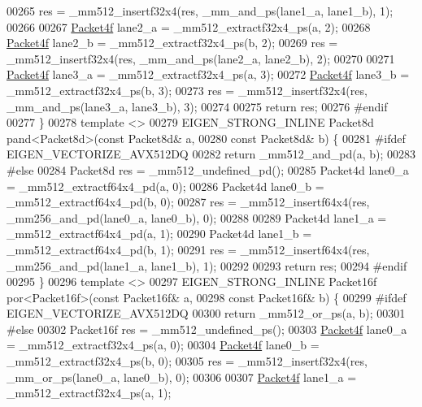 \begin{DoxyCode}
00265   res = \_mm512\_insertf32x4(res, \_mm\_and\_ps(lane1\_a, lane1\_b), 1);
00266 
00267   \hyperlink{struct_eigen_1_1internal_1_1_packet4f}{Packet4f} lane2\_a = \_mm512\_extractf32x4\_ps(a, 2);
00268   \hyperlink{struct_eigen_1_1internal_1_1_packet4f}{Packet4f} lane2\_b = \_mm512\_extractf32x4\_ps(b, 2);
00269   res = \_mm512\_insertf32x4(res, \_mm\_and\_ps(lane2\_a, lane2\_b), 2);
00270 
00271   \hyperlink{struct_eigen_1_1internal_1_1_packet4f}{Packet4f} lane3\_a = \_mm512\_extractf32x4\_ps(a, 3);
00272   \hyperlink{struct_eigen_1_1internal_1_1_packet4f}{Packet4f} lane3\_b = \_mm512\_extractf32x4\_ps(b, 3);
00273   res = \_mm512\_insertf32x4(res, \_mm\_and\_ps(lane3\_a, lane3\_b), 3);
00274 
00275   \textcolor{keywordflow}{return} res;
00276 \textcolor{preprocessor}{#endif}
00277 \}
00278 \textcolor{keyword}{template} <>
00279 EIGEN\_STRONG\_INLINE Packet8d pand<Packet8d>(\textcolor{keyword}{const} Packet8d& a,
00280                                             \textcolor{keyword}{const} Packet8d& b) \{
00281 \textcolor{preprocessor}{#ifdef EIGEN\_VECTORIZE\_AVX512DQ}
00282   \textcolor{keywordflow}{return} \_mm512\_and\_pd(a, b);
00283 \textcolor{preprocessor}{#else}
00284   Packet8d res = \_mm512\_undefined\_pd();
00285   Packet4d lane0\_a = \_mm512\_extractf64x4\_pd(a, 0);
00286   Packet4d lane0\_b = \_mm512\_extractf64x4\_pd(b, 0);
00287   res = \_mm512\_insertf64x4(res, \_mm256\_and\_pd(lane0\_a, lane0\_b), 0);
00288 
00289   Packet4d lane1\_a = \_mm512\_extractf64x4\_pd(a, 1);
00290   Packet4d lane1\_b = \_mm512\_extractf64x4\_pd(b, 1);
00291   res = \_mm512\_insertf64x4(res, \_mm256\_and\_pd(lane1\_a, lane1\_b), 1);
00292 
00293   \textcolor{keywordflow}{return} res;
00294 \textcolor{preprocessor}{#endif}
00295 \}
00296 \textcolor{keyword}{template} <>
00297 EIGEN\_STRONG\_INLINE Packet16f por<Packet16f>(\textcolor{keyword}{const} Packet16f& a,
00298                                              \textcolor{keyword}{const} Packet16f& b) \{
00299 \textcolor{preprocessor}{#ifdef EIGEN\_VECTORIZE\_AVX512DQ}
00300   \textcolor{keywordflow}{return} \_mm512\_or\_ps(a, b);
00301 \textcolor{preprocessor}{#else}
00302   Packet16f res = \_mm512\_undefined\_ps();
00303   \hyperlink{struct_eigen_1_1internal_1_1_packet4f}{Packet4f} lane0\_a = \_mm512\_extractf32x4\_ps(a, 0);
00304   \hyperlink{struct_eigen_1_1internal_1_1_packet4f}{Packet4f} lane0\_b = \_mm512\_extractf32x4\_ps(b, 0);
00305   res = \_mm512\_insertf32x4(res, \_mm\_or\_ps(lane0\_a, lane0\_b), 0);
00306 
00307   \hyperlink{struct_eigen_1_1internal_1_1_packet4f}{Packet4f} lane1\_a = \_mm512\_extractf32x4\_ps(a, 1);

\end{DoxyCode}
